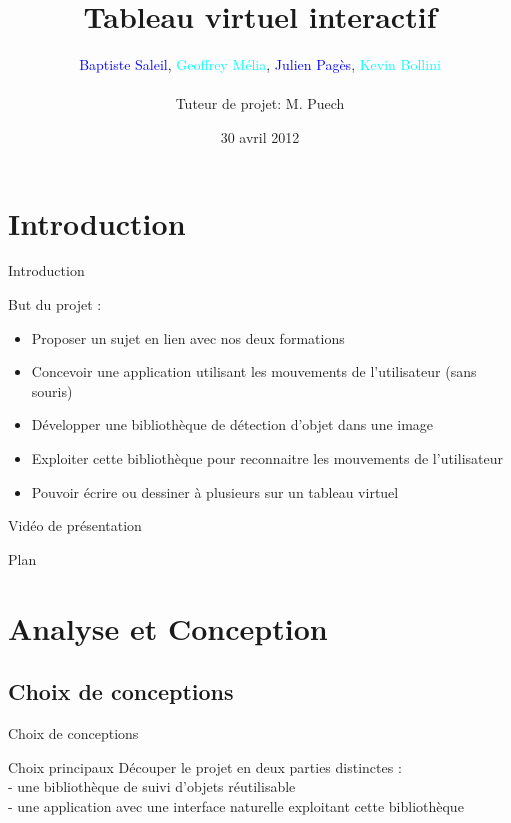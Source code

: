 \documentclass{beamer}
\title{Tableau virtuel interactif}
\author{\textcolor{blue}{Baptiste Saleil}, \textcolor{cyan}{Geoffrey Mélia}, \textcolor{blue}{Julien Pagès}, \textcolor{cyan}{Kevin Bollini} \\ \ \\Tuteur de projet: M. Puech}
\date{30 avril 2012}
\begin{document}
	\begin{frame}
		\titlepage
	\end{frame}

	\section{Introduction}
		\begin{frame}{Introduction}
		
		But du projet :
            \begin{itemize}
			\item Proposer un sujet en lien avec nos deux formations
            \item Concevoir une application utilisant les mouvements de l'utilisateur (sans souris)
            \item Développer une bibliothèque de détection d'objet dans une image
            \item Exploiter cette bibliothèque pour reconnaitre les mouvements de l'utilisateur
            \item Pouvoir écrire ou dessiner à plusieurs sur un tableau virtuel
            \end{itemize}
            
            \end{frame}

      \begin{frame}{Vidéo de présentation}
      \end{frame}

      \begin{frame}{Plan}
            \tableofcontents
      \end{frame}
            
      \section{Analyse et Conception}
      \subsection{Choix de conceptions}
            \begin{frame}{Choix de conceptions}
                  \begin{block}{Choix principaux}
                        Découper le projet en deux parties distinctes : \\
                        - une bibliothèque de suivi d'objets réutilisable \\
                        - une application avec une interface naturelle exploitant cette bibliothèque \\
                  \end{block}
            \end{frame}
            
\end{document}
